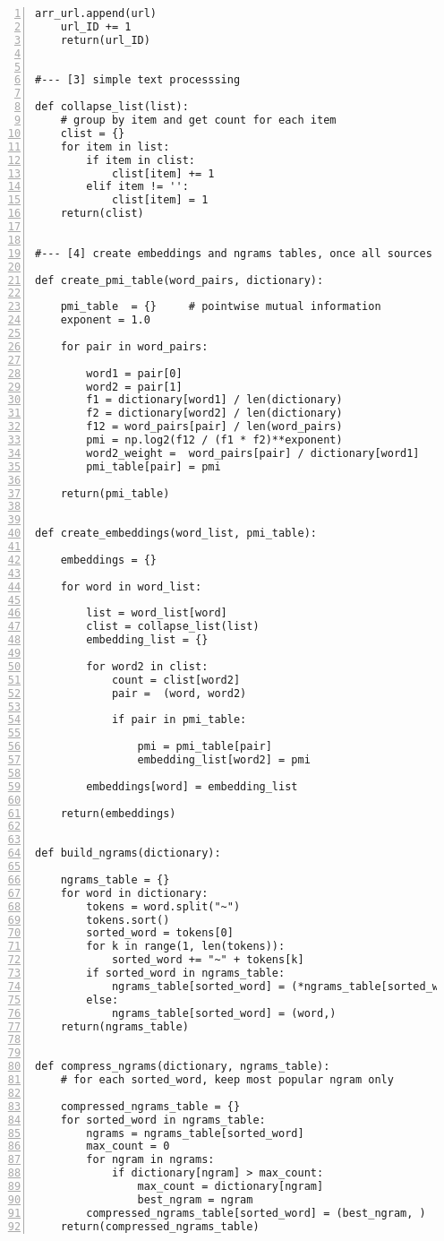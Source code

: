 \documentclass[oneside,10pt]{book}
\begin{document}
\begin{lstlisting}[numbers=left]
    arr_url.append(url)
    url_ID += 1   
    return(url_ID)


#--- [3] simple text processsing

def collapse_list(list):  
    # group by item and get count for each item
    clist = {}
    for item in list:
        if item in clist:
            clist[item] += 1
        elif item != '': 
            clist[item] = 1
    return(clist)


#--- [4] create embeddings and ngrams tables, once all sources are parsed

def create_pmi_table(word_pairs, dictionary):

    pmi_table  = {}     # pointwise mutual information 
    exponent = 1.0

    for pair in word_pairs:

        word1 = pair[0]
        word2 = pair[1]
        f1 = dictionary[word1] / len(dictionary)
        f2 = dictionary[word2] / len(dictionary)
        f12 = word_pairs[pair] / len(word_pairs) 
        pmi = np.log2(f12 / (f1 * f2)**exponent) 
        word2_weight =  word_pairs[pair] / dictionary[word1]
        pmi_table[pair] = pmi 

    return(pmi_table)


def create_embeddings(word_list, pmi_table): 

    embeddings = {}

    for word in word_list:

        list = word_list[word]
        clist = collapse_list(list)
        embedding_list = {}

        for word2 in clist:
            count = clist[word2] 
            pair =  (word, word2)

            if pair in pmi_table:

                pmi = pmi_table[pair]
                embedding_list[word2] = pmi

        embeddings[word] = embedding_list

    return(embeddings)


def build_ngrams(dictionary):

    ngrams_table = {}
    for word in dictionary:
        tokens = word.split("~")
        tokens.sort()
        sorted_word = tokens[0]
        for k in range(1, len(tokens)):
            sorted_word += "~" + tokens[k] 
        if sorted_word in ngrams_table:
            ngrams_table[sorted_word] = (*ngrams_table[sorted_word], word,)
        else:
            ngrams_table[sorted_word] = (word,) 
    return(ngrams_table)


def compress_ngrams(dictionary, ngrams_table):
    # for each sorted_word, keep most popular ngram only

    compressed_ngrams_table = {}
    for sorted_word in ngrams_table:
        ngrams = ngrams_table[sorted_word]
        max_count = 0
        for ngram in ngrams:
            if dictionary[ngram] > max_count:
                max_count = dictionary[ngram]
                best_ngram = ngram
        compressed_ngrams_table[sorted_word] = (best_ngram, )
    return(compressed_ngrams_table) 

\end{lstlisting}
\end{document}
